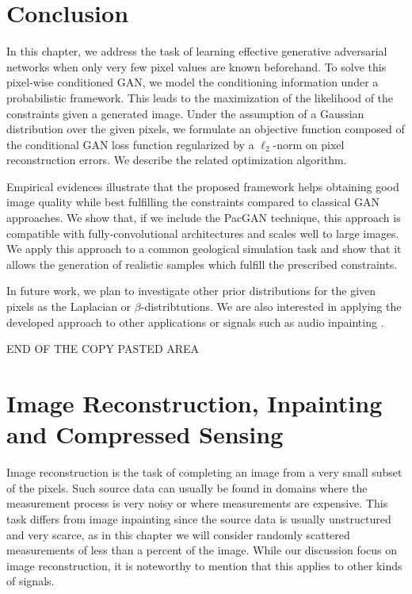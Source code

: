 \section*{Conclusion}
In this chapter, we address the task of learning effective generative adversarial networks when only very few pixel values are known beforehand. To solve this pixel-wise conditioned GAN, we model the conditioning information under a probabilistic framework. This leads to the maximization of the likelihood of the constraints given a
generated image. Under the assumption of a Gaussian distribution over the given pixels, we formulate an objective function composed of the conditional GAN loss function regularized by a $\ell_2$-norm on pixel reconstruction errors. We describe the related optimization algorithm.

Empirical evidences illustrate that the proposed framework helps obtaining good image quality while best fulfilling the constraints compared to classical GAN approaches. We show that, if we include the PacGAN technique,  this  approach  is  compatible  with  fully-convolutional  architectures  and scales well to large images. We apply this approach to a common geological simulation task and show that it allows the generation of realistic samples which fulfill the prescribed constraints.

In future work, we plan to investigate other prior distributions for the given pixels as the Laplacian or $\beta$-distribtutions. We are also interested in applying the developed approach to other applications or signals such as audio inpainting \citep{Marafioti2018}.



{\Huge END OF THE COPY PASTED AREA}


 \section{Image Reconstruction, Inpainting and Compressed Sensing}

Image reconstruction is the task of completing an image from a very small subset of the pixels. Such source data can usually be found in domains where the measurement process is very noisy or where measurements are expensive. This task differs from image inpainting since the source data is usually unstructured and very scarce, as in this chapter we will consider randomly scattered measurements of less than a percent of the image. While our discussion focus on image reconstruction, it is noteworthy to mention that this applies to other kinds of signals.

